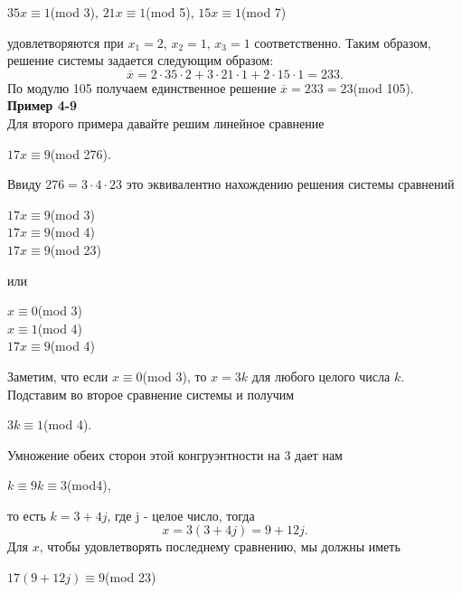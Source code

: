 \documentclass[11pt]{article}
\begin{document}
			\begin{center}	
			$35x \equiv 1$(mod 3), $21x \equiv 1$(mod 5), $15x \equiv 1$(mod 7)
			\end{center}
		удовлетворяются при $x_{1} = 2$, $x_{2} = 1$, $x_{3} = 1$ соответственно. Таким образом, решение системы задается следующим образом: $$\overline{x} = 2 \cdot 35 \cdot 2 + 3 \cdot 21 \cdot 1 + 2 \cdot 15 \cdot 1 = 233.$$ По модулю 105 получаем единственное решение $\overline{x} = 233 = 23$(mod 105).\\
	\textbf{Пример 4-9}\\
		Для второго примера давайте решим линейное сравнение
		\begin{center} 
		$17x \equiv 9$(mod 276).
		\end{center}
		Ввиду $276 = 3 \cdot 4 \cdot 23$ это эквивалентно нахождению решения системы сравнений\\
		\begin{center}
			\begin{minipage}{0.2\textwidth}
				\begin{flushleft}
					$17x \equiv 9$(mod 3)\\
					$17x \equiv 9$(mod 4)\\
					$17x \equiv 9$(mod 23)\\ 
				\end{flushleft}
			\end{minipage}
		или
			\begin{minipage}{0.2\textwidth}
				\begin{flushright}
					$x \equiv 0$(mod 3)\\
					$x \equiv 1$(mod 4)\\
					$17x \equiv 9$(mod 4)
				\end{flushright}
			\end{minipage}	
		\end{center}
		Заметим, что если $x \equiv 0$(mod 3), то $x = 3k$ для любого целого числа $k$. Подставим во второе сравнение системы и получим
		\begin{center}	
		$3k \equiv 1$(mod 4).
		\end{center} 
		Умножение обеих сторон этой конгруэнтности на 3 дает нам
		\begin{center} 
		$k \equiv 9k \equiv 3$(mod4),
		\end{center} 
		то есть $k = 3 + 4j$, где j - целое число, тогда $$x = 3(3 + 4j) = 9 + 12j.$$ Для $x$, чтобы удовлетворять последнему сравнению, мы должны иметь
		\begin{center} 
		$17(9 + 12j) \equiv 9$(mod 23)
		\end{center} 
\end{document}
